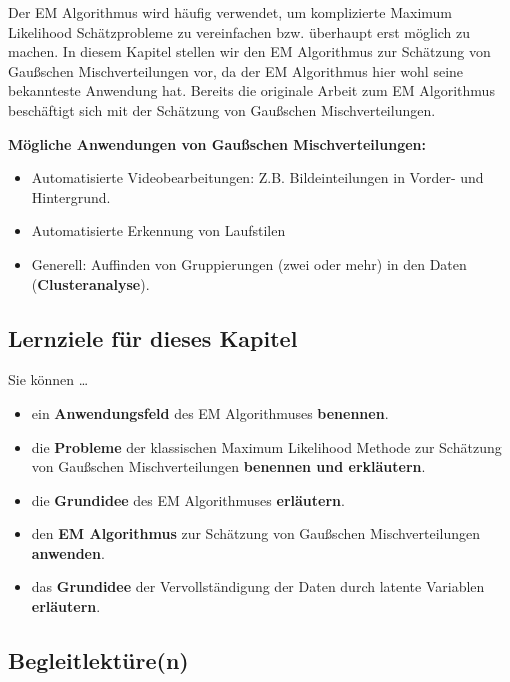 \documentclass[
  ngerman,
]{book}
\providecommand{\tightlist}{%
  \setlength{\itemsep}{0pt}\setlength{\parskip}{0pt}}
\begin{document}
Der EM Algorithmus wird häufig verwendet, um komplizierte Maximum Likelihood Schätzprobleme zu vereinfachen bzw. überhaupt erst möglich zu machen. In diesem Kapitel stellen wir den EM Algorithmus zur Schätzung von Gaußschen Mischverteilungen vor, da der EM Algorithmus hier wohl seine bekannteste Anwendung hat. Bereits die originale Arbeit zum EM Algorithmus \citep{Dempster_1977} beschäftigt sich mit der Schätzung von Gaußschen Mischverteilungen.

\textbf{Mögliche Anwendungen von Gaußschen Mischverteilungen:}

\begin{itemize}
\tightlist
\item
  Automatisierte Videobearbeitungen: Z.B. Bildeinteilungen in Vorder- und Hintergrund.
\item
  Automatisierte Erkennung von Laufstilen
\item
  Generell: Auffinden von Gruppierungen (zwei oder mehr) in den Daten (\textbf{Clusteranalyse}).
\end{itemize}

\hypertarget{lernziele-fuxfcr-dieses-kapitel}{%
\subsection*{Lernziele für dieses Kapitel}\label{lernziele-fuxfcr-dieses-kapitel}}

Sie können \ldots{}

\begin{itemize}
\tightlist
\item
  ein \textbf{Anwendungsfeld} des EM Algorithmuses \textbf{benennen}.
\item
  die \textbf{Probleme} der klassischen Maximum Likelihood Methode zur Schätzung von Gaußschen Mischverteilungen \textbf{benennen und erkläutern}.
\item
  die \textbf{Grundidee} des EM Algorithmuses \textbf{erläutern}.
\item
  den \textbf{EM Algorithmus} zur Schätzung von Gaußschen Mischverteilungen \textbf{anwenden}.
\item
  das \textbf{Grundidee} der Vervollständigung der Daten durch latente Variablen \textbf{erläutern}.
\end{itemize}

\hypertarget{begleitlektuxfcren}{%
\subsection*{Begleitlektüre(n)}\label{begleitlektuxfcren}}
\end{document}
